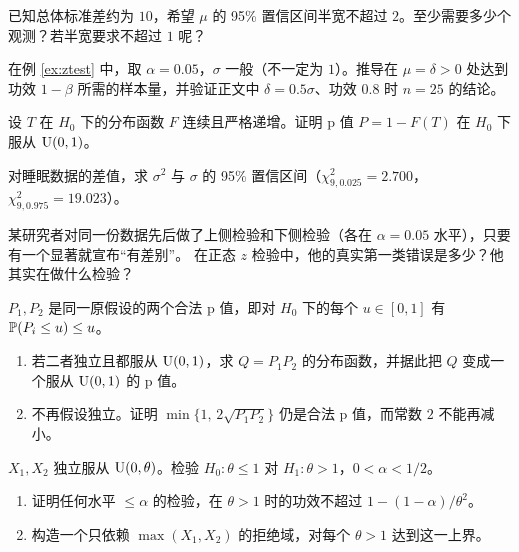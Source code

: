 \begin{exercise}
已知总体标准差约为 $10$，希望 $\mu$ 的 95\% 置信区间半宽不超过 $2$。至少需要多少个观测？若半宽要求不超过 $1$ 呢？
\end{exercise}

\levelB
\begin{exercise}
在例 \ref{ex:ztest} 中，取 $\alpha=0.05$，$\sigma$ 一般（不一定为 $1$）。推导在 $\mu=\delta>0$ 处达到功效 $1-\beta$ 所需的样本量，并验证正文中 $\delta=0.5\sigma$、功效 $0.8$ 时 $n=25$ 的结论。
\end{exercise}

\begin{exercise}\label{ex4:uniform}
设 $T$ 在 $H_0$ 下的分布函数 $F$ 连续且严格递增。证明 p 值 $P=1-F(T)$ 在 $H_0$ 下服从 $\Unif(0,1)$。
\end{exercise}

\begin{exercise}
对睡眠数据的差值，求 $\sigma^2$ 与 $\sigma$ 的 95\% 置信区间（$\chi^2_{9,0.025}=2.700$，$\chi^2_{9,0.975}=19.023$）。
\end{exercise}

\begin{exercise}
某研究者对同一份数据先后做了上侧检验和下侧检验（各在 $\alpha=0.05$ 水平），只要有一个显著就宣布“有差别”。
在正态 $z$ 检验中，他的真实第一类错误是多少？他其实在做什么检验？
\end{exercise}

\levelC
\begin{exercise}[原讲义习题 4.3]
$P_1,P_2$ 是同一原假设的两个合法 p 值，即对 $H_0$ 下的每个 $u\in[0,1]$ 有 $\P(P_i\le u)\le u$。
\begin{enumerate}
\item 若二者独立且都服从 $\Unif(0,1)$，求 $Q=P_1P_2$ 的分布函数，并据此把 $Q$ 变成一个服从 $\Unif(0,1)$ 的 p 值。
\item 不再假设独立。证明 $\min\{1,\,2\sqrt{P_1P_2}\}$ 仍是合法 p 值，而常数 $2$ 不能再减小。
\end{enumerate}
\end{exercise}

\begin{exercise}[原讲义习题 4.5]
$X_1,X_2$ 独立服从 $\Unif(0,\theta)$。检验 $H_0:\theta\le1$ 对 $H_1:\theta>1$，$0<\alpha<1/2$。
\begin{enumerate}
\item 证明任何水平 $\le\alpha$ 的检验，在 $\theta>1$ 时的功效不超过 $1-(1-\alpha)/\theta^2$。
\item 构造一个只依赖 $\max(X_1,X_2)$ 的拒绝域，对每个 $\theta>1$ 达到这一上界。
\end{enumerate}
\end{exercise}
